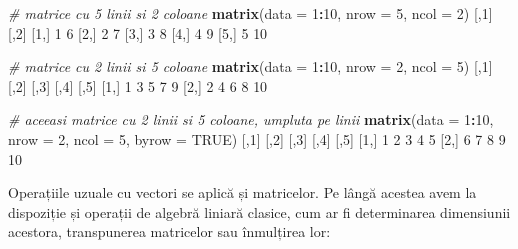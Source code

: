 \documentclass[]{article}
\newenvironment{Shaded}{\begin{snugshade}}{\end{snugshade}}
\newcommand{\KeywordTok}[1]{\textcolor[rgb]{0.13,0.29,0.53}{\textbf{#1}}}
\newcommand{\DataTypeTok}[1]{\textcolor[rgb]{0.13,0.29,0.53}{#1}}
\newcommand{\DecValTok}[1]{\textcolor[rgb]{0.00,0.00,0.81}{#1}}
\newcommand{\CommentTok}[1]{\textcolor[rgb]{0.56,0.35,0.01}{\textit{#1}}}
\newcommand{\OtherTok}[1]{\textcolor[rgb]{0.56,0.35,0.01}{#1}}
\newcommand{\OperatorTok}[1]{\textcolor[rgb]{0.81,0.36,0.00}{\textbf{#1}}}
\newcommand{\NormalTok}[1]{#1}
\begin{document}
\begin{Shaded}
\begin{Highlighting}[]
\CommentTok{# matrice cu 5 linii si 2 coloane}
\KeywordTok{matrix}\NormalTok{(}\DataTypeTok{data =} \DecValTok{1}\OperatorTok{:}\DecValTok{10}\NormalTok{,}
       \DataTypeTok{nrow =} \DecValTok{5}\NormalTok{,}
       \DataTypeTok{ncol =} \DecValTok{2}\NormalTok{)}
\NormalTok{     [,}\DecValTok{1}\NormalTok{] [,}\DecValTok{2}\NormalTok{]}
\NormalTok{[}\DecValTok{1}\NormalTok{,]    }\DecValTok{1}    \DecValTok{6}
\NormalTok{[}\DecValTok{2}\NormalTok{,]    }\DecValTok{2}    \DecValTok{7}
\NormalTok{[}\DecValTok{3}\NormalTok{,]    }\DecValTok{3}    \DecValTok{8}
\NormalTok{[}\DecValTok{4}\NormalTok{,]    }\DecValTok{4}    \DecValTok{9}
\NormalTok{[}\DecValTok{5}\NormalTok{,]    }\DecValTok{5}   \DecValTok{10}

\CommentTok{# matrice cu 2 linii si 5 coloane}
\KeywordTok{matrix}\NormalTok{(}\DataTypeTok{data =} \DecValTok{1}\OperatorTok{:}\DecValTok{10}\NormalTok{,}
       \DataTypeTok{nrow =} \DecValTok{2}\NormalTok{,}
       \DataTypeTok{ncol =} \DecValTok{5}\NormalTok{)}
\NormalTok{     [,}\DecValTok{1}\NormalTok{] [,}\DecValTok{2}\NormalTok{] [,}\DecValTok{3}\NormalTok{] [,}\DecValTok{4}\NormalTok{] [,}\DecValTok{5}\NormalTok{]}
\NormalTok{[}\DecValTok{1}\NormalTok{,]    }\DecValTok{1}    \DecValTok{3}    \DecValTok{5}    \DecValTok{7}    \DecValTok{9}
\NormalTok{[}\DecValTok{2}\NormalTok{,]    }\DecValTok{2}    \DecValTok{4}    \DecValTok{6}    \DecValTok{8}   \DecValTok{10}

\CommentTok{# aceeasi matrice cu 2 linii si 5 coloane, umpluta pe linii }
\KeywordTok{matrix}\NormalTok{(}\DataTypeTok{data =} \DecValTok{1}\OperatorTok{:}\DecValTok{10}\NormalTok{,}
       \DataTypeTok{nrow =} \DecValTok{2}\NormalTok{,}
       \DataTypeTok{ncol =} \DecValTok{5}\NormalTok{,}
       \DataTypeTok{byrow =} \OtherTok{TRUE}\NormalTok{)}
\NormalTok{     [,}\DecValTok{1}\NormalTok{] [,}\DecValTok{2}\NormalTok{] [,}\DecValTok{3}\NormalTok{] [,}\DecValTok{4}\NormalTok{] [,}\DecValTok{5}\NormalTok{]}
\NormalTok{[}\DecValTok{1}\NormalTok{,]    }\DecValTok{1}    \DecValTok{2}    \DecValTok{3}    \DecValTok{4}    \DecValTok{5}
\NormalTok{[}\DecValTok{2}\NormalTok{,]    }\DecValTok{6}    \DecValTok{7}    \DecValTok{8}    \DecValTok{9}   \DecValTok{10}
\end{Highlighting}
\end{Shaded}

Operațiile uzuale cu vectori se aplică și matricelor. Pe lângă acestea
avem la dispoziție și operații de algebră liniară clasice, cum ar fi
determinarea dimensiunii acestora, transpunerea matricelor sau
înmulțirea lor:
\end{document}
